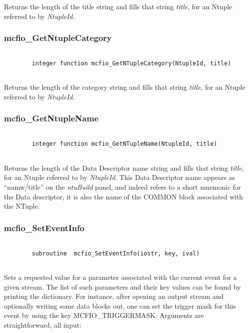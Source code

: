 Returns the length of the title string and fills that string {\em
title}, for an Ntuple referred to by {\em NtupleId}.

\subsubsection{mcfio\_GetNtupleCategory}

\begin{verbatim}

        integer function mcfio_GetNTupleCategory(NtupleId, title)
        
\end{verbatim}

Returns the length of the category string and fills that string {\em
title}, for an Ntuple referred to by {\em NtupleId}.

\subsubsection{mcfio\_GetNtupleName}

\begin{verbatim}

        integer function mcfio_GetNTupleName(NtupleId, title)
        
\end{verbatim}

Returns the length of the Data Descriptor name string and fills that string {\em
title}, for an Ntuple referred to by {\em NtupleId}.  This Data Descriptor name appears as 
``namw/title'' on the {\em ntuBuild} panel, and indeed refers to a short mnemonic
for the Data descriptor, it is also the name of the COMMON block associated
with the NTuple.  


\subsubsection{mcfio\_SetEventInfo}

\begin{verbatim}

        subroutine  mcfio_SetEventInfo(iostr, key, ival)
    
\end{verbatim}

Sets a requested  value for a parameter associated with the current
event for a given stream. The list of such parameters and their key values 
can be found by printing the dictionary. For instance, after opening an output
stream and optionally writing some data blocks out, one can set the trigger
mask for this event by using the key 
MCFIO\_TRIGGERMASK. Arguments are straightforward, all input:

